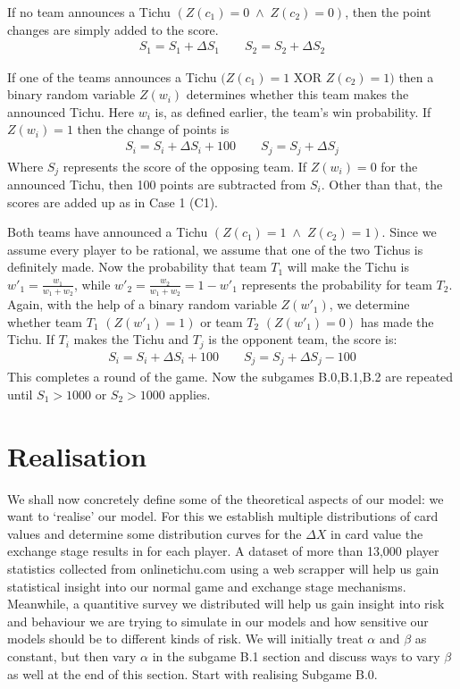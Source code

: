 \begin{axioms}[(C1)]
\item   If no team announces a Tichu $(Z(c_1) = 0\;\land\; Z(c_2) = 0)$, then the point changes are simply added to the score.
\begin{gather*}
S_1 = S_1 + \Delta S_1 \qquad S_2 = S_2 + \Delta S_2
\end{gather*}
\item If one of the teams announces a Tichu $(Z(c_1) = 1$ XOR $Z(c_2) = 1)$ then a binary random variable $Z(w_i)$ determines whether this team makes the announced Tichu. Here $w_i$ is, as defined earlier, the team's win probability. If $Z(w_i) = 1$ then the change of points is
\begin{gather*}
S_i = S_i + \Delta S_i + 100 \qquad S_j = S_j + \Delta S_j
\end{gather*}
Where $S_j$ represents the score of the opposing team. If $Z(w_i) = 0$ for the announced Tichu, then 100 points are subtracted from $S_i$. Other than that, the scores are added up as in Case 1 (C1).
\item Both teams have announced a Tichu $(Z(c_1) = 1\;\land\; Z(c_2) = 1)$. Since we assume every player to be rational, we assume that one of the two Tichus is definitely made. Now the probability that team $T_1$ will make the Tichu is $w'_1 = \frac{w_1}{w_1+w_2}$, while $w'_2 =\frac{w_2}{w_1+w_2} = 1- w'_1$ represents the probability for team $T_2$. Again, with the help of a binary random variable $Z(w'_1)$, we determine whether team $T_1$ $(Z(w'_1) = 1)$ or team $T_2$ $(Z(w'_1) = 0)$ has made the Tichu. If $T_i$ makes the Tichu and $T_j$ is the opponent team, the score is:
\begin{gather*}
S_i = S_i + \Delta S_i + 100 \qquad S_j = S_j + \Delta S_j - 100
\end{gather*}
This completes a round of the game. Now the subgames B.0,B.1,B.2 are repeated until $S_1 > 1000$ or $S_2 > 1000$ applies.
\end{axioms}
\section{Realisation}
We shall now concretely define some of the theoretical aspects of our model: we want to ‘realise’ our model. For this we establish multiple distributions of card values and determine some distribution curves for the $\Delta  X$ in card value the exchange stage results in for each player. A dataset of more than 13,000 player statistics collected from onlinetichu.com using a web scrapper will help us gain statistical insight into our normal game and exchange stage mechanisms. Meanwhile, a quantitive survey we distributed will help us gain insight into risk and behaviour we are trying to simulate in our models and how sensitive our models should be to different kinds of risk. We will initially treat $\alpha$ and $\beta$ as constant, but then vary $\alpha$ in the subgame B.1 section and discuss ways to vary $\beta$ as well at the end of this section. Start with realising Subgame B.0.

